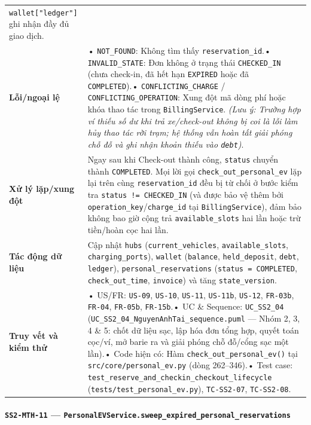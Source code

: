 \documentclass[11pt,a4paper]{article}
\begin{document}
\begin{longtable}[]{@{}
  >{\raggedright\arraybackslash}p{}
  >{\raggedright\arraybackslash}p{}@{}}
\texttt{wallet{[}"ledger"{]}} ghi nhận đầy đủ giao dịch. \\
\textbf{Lỗi/ngoại lệ} & • \texttt{NOT\_FOUND}: Không tìm thấy
\texttt{reservation\_id}.• \texttt{INVALID\_STATE}: Đơn không ở trạng
thái \texttt{CHECKED\_IN} (chưa check-in, đã hết hạn \texttt{EXPIRED}
hoặc đã \texttt{COMPLETED}).• \texttt{CONFLICTING\_CHARGE} /
\texttt{CONFLICTING\_OPERATION}: Xung đột mã dòng phí hoặc khóa thao tác
trong \texttt{BillingService}. \emph{(Lưu ý: Trường hợp ví thiếu số dư
khi trả xe/check-out không bị coi là lỗi làm hủy thao tác rời trạm; hệ
thống vẫn hoàn tất giải phóng chỗ đỗ và ghi nhận khoản thiếu vào
\texttt{debt})}. \\
\textbf{Xử lý lặp/xung đột} & Ngay sau khi Check-out thành công,
\texttt{status} chuyển thành \texttt{COMPLETED}. Mọi lời gọi
\texttt{check\_out\_personal\_ev} lặp lại trên cùng
\texttt{reservation\_id} đều bị từ chối ở bước kiểm tra
\texttt{status\ !=\ CHECKED\_IN} (và được bảo vệ thêm bởi
\texttt{operation\_key}/\texttt{charge\_id} tại
\texttt{BillingService}), đảm bảo không bao giờ cộng trả
\texttt{available\_slots} hai lần hoặc trừ tiền/hoàn cọc hai lần. \\
\textbf{Tác động dữ liệu} & Cập nhật \texttt{hubs}
(\texttt{current\_vehicles}, \texttt{available\_slots},
\texttt{charging\_ports}), \texttt{wallet} (\texttt{balance},
\texttt{held\_deposit}, \texttt{debt}, \texttt{ledger}),
\texttt{personal\_reservations} (\texttt{status\ =\ COMPLETED},
\texttt{check\_out\_time}, \texttt{invoice}) và tăng
\texttt{state\_version}. \\
\textbf{Truy vết và kiểm thử} & • US/FR: \texttt{US-09}, \texttt{US-10},
\texttt{US-11}, \texttt{US-11b}, \texttt{US-12}, \texttt{FR-03b},
\texttt{FR-04}, \texttt{FR-05b}, \texttt{FR-15b}.• UC \& Sequence:
\texttt{UC\_SS2\_04} (\texttt{UC\_SS2\_04\_NguyenAnhTai\_sequence.puml}
--- Nhóm 2, 3, 4 \& 5: chốt dữ liệu sạc, lập hóa đơn tổng hợp, quyết
toán cọc/ví, mở barie ra và giải phóng chỗ đỗ/cổng sạc một lần).• Code
hiện có: Hàm \texttt{check\_out\_personal\_ev()} tại
\texttt{src/core/personal\_ev.py} (dòng 262--346).• Test case:
\texttt{test\_reserve\_and\_checkin\_checkout\_lifecycle}
(\texttt{tests/test\_personal\_ev.py}), \texttt{TC-SS2-07},
\texttt{TC-SS2-08}. \\
\end{longtable}

\hypertarget{ss2-mth-11-personalevservice.sweep_expired_personal_reservations}{%
\paragraph{\texorpdfstring{\texttt{SS2-MTH-11} ---
\texttt{PersonalEVService.sweep\_expired\_personal\_reservations}}{SS2-MTH-11 --- PersonalEVService.sweep\_expired\_personal\_reservations}}\label{ss2-mth-11-personalevservice.sweep_expired_personal_reservations}}
\end{document}
